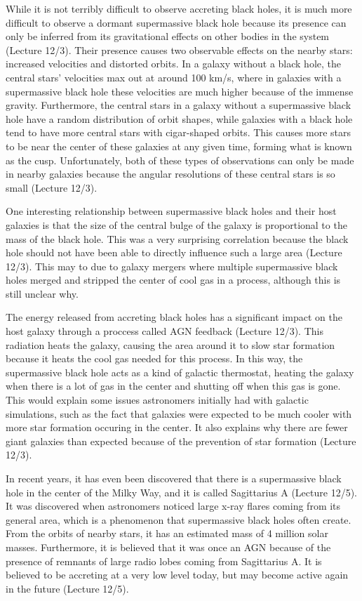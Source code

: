 \documentclass[12pt]{article}
\begin{document}
While it is not terribly difficult to observe accreting black holes, it is much
more difficult to observe a dormant supermassive black hole because its presence
can only be inferred from its gravitational effects on other bodies in the
system (Lecture 12/3).  Their presence causes two observable effects on the nearby stars:
increased velocities and distorted orbits.  In a galaxy without a black hole,
the central stars' velocities max out at around 100 km/s, where in galaxies with
a supermassive black hole these velocities are much higher because of the
immense gravity.  Furthermore, the central stars in a galaxy without a
supermassive black hole have a random distribution of orbit shapes, while
galaxies with a black hole tend to have more central stars with cigar-shaped
orbits.  This causes more stars to be near the center of these galaxies at any
given time, forming what is known as the cusp.  Unfortunately, both of these
types of observations can only be made in nearby galaxies because the angular
resolutions of these central stars is so small (Lecture 12/3).

One interesting relationship between supermassive black holes and their host
galaxies is that the size of the central bulge of the galaxy is proportional to
the mass of the black hole.  This was a very surprising correlation because the
black hole should not have been able to directly influence such a large area
(Lecture 12/3).
This may to due to galaxy mergers where multiple supermassive black holes merged
and stripped the center of cool gas in a process, although this is still unclear
why.

The energy released from accreting black holes has a significant impact on the
host galaxy through a proccess called AGN feedback (Lecture 12/3).  This radiation
heats the
galaxy, causing the area around it to slow star formation because it heats the
cool gas needed for this process.  In this way, the supermassive black hole acts
as a kind of galactic thermostat, heating the galaxy when there is a lot of gas
in the center and shutting off when this gas is gone.  This would explain some
issues astronomers initially had with galactic simulations, such as the fact
that galaxies were expected to be much cooler with more star formation occuring
in the center.  It also explains why there are fewer giant galaxies than
expected because of the prevention of star formation (Lecture 12/3).

In recent years, it has even been discovered that there is a supermassive black
hole in the center of the Milky Way, and it is called Sagittarius A (Lecture
12/5).  It was
discovered when astronomers noticed large x-ray flares coming from its general
area, which is a phenomenon that supermassive black holes often create.  From
the orbits of nearby stars, it has an estimated mass of 4 million solar masses.
Furthermore, it is believed that it was once an AGN because of the presence of
remnants of large radio lobes coming from Sagittarius A.  It is believed to be
accreting at a very low level today, but may become active again in the future
(Lecture 12/5).
\end{document}
